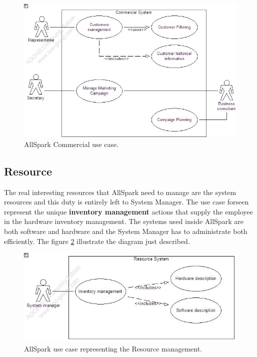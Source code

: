 \begin{figure}
\begin{centering}
\includegraphics[scale=0.45]{assign3/adonis/imgs/commercial.jpg}
\caption{AllSpark Commercial use case.}
\label{2img:[use]commercial}
\end{centering}
\end{figure}


\subsection{Resource}
The real interesting resources that AllSpark need to manage are the system resources and this duty is entirely left to System Manager. The use case forseen represent the unique \textbf{inventory management} actions that supply the employee in the hardware inventory management. The systems used inside AllSpark are both software and hardware and the System Manager has to administrate both efficiently. The figure \ref{2img:[use]resource} illustrate the diagram just described.

\begin{figure}
\begin{centering}
\includegraphics[scale=0.45]{assign3/adonis/imgs/resource.jpg}
\caption{AllSpark use case representing the Resource management.}
\label{2img:[use]resource}
\end{centering}
\end{figure}


